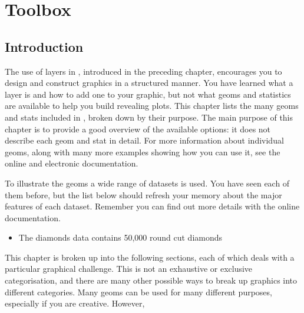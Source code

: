 

% 


\chapter{Toolbox}
\label{cha:toolbox}

\section{Introduction}

The use of layers in \ggplot, introduced in the preceding chapter, encourages you to design and construct graphics in a structured manner.  You have learned what a layer is and how to add one to your graphic, but not what geoms and statistics are available to help you build revealing plots.  This chapter lists the many geoms and stats included in \ggplot, broken down by their purpose.  The main purpose of this chapter is to provide a good overview of the available options: it does not describe each geom and stat in detail.  For more information about individual geoms, along with many more examples showing how you can use it, see the online and electronic documentation.

To illustrate the geoms a wide range of datasets is used.  You have seen each of them before, but the list below should refresh your memory about the major features of each dataset.  Remember you can find out more details with the online documentation.

\begin{itemize}
  \item The diamonds data contains 50,000 round cut diamonds
\end{itemize}

This chapter is broken up into the following sections, each of which deals with a particular graphical challenge.  This is not an exhaustive or exclusive categorisation, and there are many other possible ways to break up graphics into different categories.  Many geoms can be used for many different purposes, especially if you are creative.  However, 

